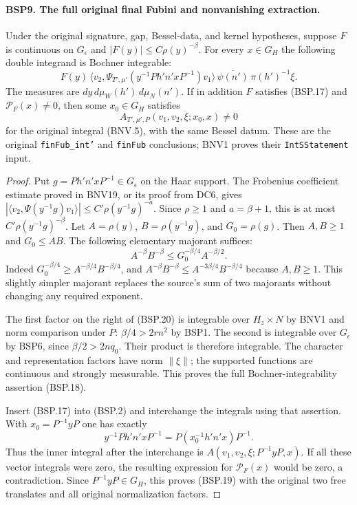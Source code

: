 \documentclass[11pt,a4paper]{article}
\numberwithin{equation}{section}
\theoremstyle{remark}\newtheorem{remark}[theorem]{Remark}
\begin{document}
\paragraph{BSP9. The full original final Fubini and nonvanishing extraction.}
\label{claim:BSP9}
Under the original signature, gap, Bessel-data, and kernel hypotheses,
suppose $F$ is continuous on $G_\epsilon$ and
$|F(y)|\le C\rho(y)^{-\beta}$.
For every $x\in G_H$ the following double integrand is Bochner integrable:
\[
 F(y)\,
 \langle v_2,\Psi_{T',\mu'}
        (y^{-1}P h'n'xP^{-1})v_1\rangle\,
 \overline{\psi(n')}\,\pi(h')^{-1}\xi.
 \tag{BSP.18}
\]
The measures are $dy\,d\mu_W(h')\,d\mu_N(n')$.
If in addition $F$ satisfies (BSP.17) and
$\mathcal P_F(x)\ne0$, then some $x_0\in G_H$ satisfies
\[
 A_{T',\mu',P}(v_1,v_2,\xi;x_0,x)\ne0
 \tag{BSP.19}
\]
for the original integral (BNV.5), with the same Bessel datum.
These are the original \texttt{fin\allowbreak Fub\_\allowbreak int'} and \texttt{fin\allowbreak Fub}
conclusions; BNV1 proves their \texttt{Int\allowbreak SStatement} input.

\begin{proof}
Put $g=P h'n'xP^{-1}\in G_\epsilon$ on the Haar support.
The Frobenius coefficient estimate proved in BNV19, or its proof
from DC6, gives
$|\langle v_2,\Psi(y^{-1}g)v_1\rangle|
       \le C'\rho(y^{-1}g)^{-a}$.
Since $\rho\ge1$ and $a=\beta+1$, this is at most
$C'\rho(y^{-1}g)^{-\beta}$.
Let $A=\rho(y)$, $B=\rho(y^{-1}g)$, and $G_0=\rho(g)$.
Then $A,B\ge1$ and $G_0\le AB$.
The following elementary majorant suffices:
\[
 A^{-\beta}B^{-\beta}
   \le G_0^{-\beta/4}A^{-\beta/2}.
 \tag{BSP.20}
\]
Indeed $G_0^{-\beta/4}\ge A^{-\beta/4}B^{-\beta/4}$,
and $A^{-\beta}B^{-\beta}\le
A^{-3\beta/4}B^{-\beta/4}$ because $A,B\ge1$.
This slightly simpler majorant replaces the source's sum of two
majorants without changing any required exponent.

The first factor on the right of (BSP.20) is integrable over
$H_z\times N$ by BNV1 and norm comparison under $P$:
$\beta/4>2rn^2$ by BSP1.
The second is integrable over $G_\epsilon$ by BSP6, since
$\beta/2>2nq_0$.  Their product is therefore integrable.
The character and representation factors have norm $\|\xi\|$;
the supported functions are continuous and strongly measurable.
This proves the full Bochner-integrability assertion (BSP.18).

Insert (BSP.17) into (BSP.2) and interchange the integrals using
that assertion.  With $x_0=P^{-1}yP$ one has exactly
\[
 y^{-1}P h'n'xP^{-1}
       =P(x_0^{-1}h'n'x)P^{-1}.
\]
Thus the inner integral after the interchange is
$A(v_1,v_2,\xi;P^{-1}yP,x)$.
If all these vector integrals were zero, the resulting expression
for $\mathcal P_F(x)$ would be zero, a contradiction.
Since $P^{-1}yP\in G_H$, this proves (BSP.19) with the original
two free translates and all original normalization factors.
\end{proof}
\end{document}
